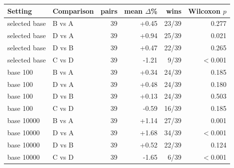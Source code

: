 \begin{tabular}{llrrrr}
\toprule
Setting & Comparison & pairs & mean $\Delta$\% & wins & Wilcoxon $p$ \\
\midrule
selected base & B vs A & 39 & +0.45 & 23/39 & 0.277 \\
selected base & D vs A & 39 & +0.94 & 25/39 & 0.021 \\
selected base & D vs B & 39 & +0.47 & 22/39 & 0.265 \\
selected base & C vs D & 39 & -1.21 & 9/39 & $<$0.001 \\
base 100 & B vs A & 39 & +0.34 & 24/39 & 0.185 \\
base 100 & D vs A & 39 & +0.48 & 24/39 & 0.180 \\
base 100 & D vs B & 39 & +0.13 & 24/39 & 0.503 \\
base 100 & C vs D & 39 & -0.59 & 16/39 & 0.185 \\
base 10000 & B vs A & 39 & +1.14 & 27/39 & 0.001 \\
base 10000 & D vs A & 39 & +1.68 & 34/39 & $<$0.001 \\
base 10000 & D vs B & 39 & +0.52 & 22/39 & 0.124 \\
base 10000 & C vs D & 39 & -1.65 & 6/39 & $<$0.001 \\
\bottomrule
\end{tabular}

